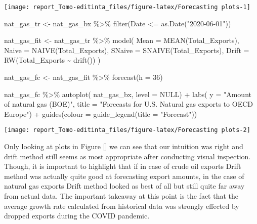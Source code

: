 \documentclass[
]{article}
\newenvironment{Shaded}{\begin{snugshade}}{\end{snugshade}}
\newcommand{\AttributeTok}[1]{\textcolor[rgb]{0.77,0.63,0.00}{#1}}
\newcommand{\ConstantTok}[1]{\textcolor[rgb]{0.00,0.00,0.00}{#1}}
\newcommand{\DecValTok}[1]{\textcolor[rgb]{0.00,0.00,0.81}{#1}}
\newcommand{\FunctionTok}[1]{\textcolor[rgb]{0.00,0.00,0.00}{#1}}
\newcommand{\NormalTok}[1]{#1}
\newcommand{\OtherTok}[1]{\textcolor[rgb]{0.56,0.35,0.01}{#1}}
\newcommand{\SpecialCharTok}[1]{\textcolor[rgb]{0.00,0.00,0.00}{#1}}
\newcommand{\StringTok}[1]{\textcolor[rgb]{0.31,0.60,0.02}{#1}}
\begin{document}
\begin{center}\texttt{[image: report\_Tomo-editinta\_files/figure-latex/Forecasting plots-1]} \end{center}

\begin{Shaded}
\begin{Highlighting}[]
\NormalTok{nat\_gas\_tr }\OtherTok{\textless{}{-}}\NormalTok{ nat\_gas\_bx }\SpecialCharTok{\%\textgreater{}\%} 
  \FunctionTok{filter}\NormalTok{(Date }\SpecialCharTok{\textless{}=} \FunctionTok{as.Date}\NormalTok{(}\StringTok{"2020{-}06{-}01"}\NormalTok{))}


\NormalTok{nat\_gas\_fit }\OtherTok{\textless{}{-}}\NormalTok{ nat\_gas\_tr }\SpecialCharTok{\%\textgreater{}\%} 
  \FunctionTok{model}\NormalTok{(}
    \AttributeTok{Mean =} \FunctionTok{MEAN}\NormalTok{(Total\_Exports),}
    \AttributeTok{Naive =} \FunctionTok{NAIVE}\NormalTok{(Total\_Exports),}
    \AttributeTok{SNaive =} \FunctionTok{SNAIVE}\NormalTok{(Total\_Exports),}
    \AttributeTok{Drift =} \FunctionTok{RW}\NormalTok{(Total\_Exports }\SpecialCharTok{\textasciitilde{}} \FunctionTok{drift}\NormalTok{())}
\NormalTok{  )}

\NormalTok{nat\_gas\_fc }\OtherTok{\textless{}{-}}\NormalTok{ nat\_gas\_fit }\SpecialCharTok{\%\textgreater{}\%} 
  \FunctionTok{forecast}\NormalTok{(}\AttributeTok{h =} \DecValTok{36}\NormalTok{)}

\NormalTok{nat\_gas\_fc }\SpecialCharTok{\%\textgreater{}\%} 
  \FunctionTok{autoplot}\NormalTok{(}
\NormalTok{    nat\_gas\_bx,}
    \AttributeTok{level =} \ConstantTok{NULL}\NormalTok{) }\SpecialCharTok{+}
  \FunctionTok{labs}\NormalTok{(}
    \AttributeTok{y =} \StringTok{"Amount of natural gas (BOE)"}\NormalTok{,}
    \AttributeTok{title =} \StringTok{"Forecasts for U.S. Natural gas exports to OECD Europe"}\NormalTok{) }\SpecialCharTok{+}
  \FunctionTok{guides}\NormalTok{(}\AttributeTok{colour =} \FunctionTok{guide\_legend}\NormalTok{(}\AttributeTok{title =} \StringTok{"Forecast"}\NormalTok{))}
\end{Highlighting}
\end{Shaded}

\begin{center}\texttt{[image: report\_Tomo-editinta\_files/figure-latex/Forecasting plots-2]} \end{center}

Only looking at plots in Figure {[}{]} we can see that our intuition was
right and drift method still seems as most appropriate after conducting
visual inspection. Though, it is important to highlight that if in case
of crude oil exports Drift method was actually quite good at forecasting
export amounts, in the case of natural gas exports Drift method looked
as best of all but still quite far away from actual data. The important
takeaway at this point is the fact that the average growth rate
calculated from historical data was strongly effected by dropped exports
during the COVID pandemic.
\end{document}
